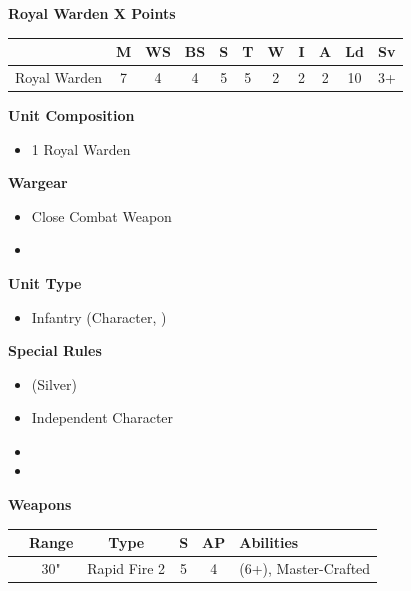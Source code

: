 \subsubsection[Royal Warden]{}
\begin{minipage}[t]{0.72\textwidth}
	{\large \textbf{Royal Warden \dotfill X Points}}
	
	\begin{tabular}{m{165 pt} *{10}{c}}
		& M & WS & BS & S & T & W & I & A & Ld & Sv \\
		\hline
		Royal Warden & 7 & 4 & 4 & 5 & 5 & 2 & 2 & 2 & 10 & 3+ \\
	\end{tabular}
	\small
	\begin{minipage}[t]{0.5\textwidth}
		\begin{flushleft}
		\vspace*{2em}
		\textbf{Unit Composition}
		\begin{itemize}
			\item 1 Royal Warden
		\end{itemize}
		
		\textbf{Wargear}
		\begin{itemize}
			\item Close Combat Weapon
			\item {}
		\end{itemize}
		\end{flushleft}
	\end{minipage}
	\begin{minipage}{0.5\textwidth}
		\vspace*{2em}
		\textbf{Unit Type}
		\begin{itemize}
			\item Infantry (Character, )
		\end{itemize}
		
		\textbf{Special Rules}
		\begin{itemize}
			\item {} (Silver)
			\item Independent Character
			\item {}
			\item %
		\end{itemize}
	\end{minipage}
	
	\vspace*{2em}
	\textbf{Weapons}
	
	\begin{tabular}{m{95 pt} *{4}{c} >{\raggedright\arraybackslash}p{130pt}}
		& Range & Type & S & AP & Abilities \\
		\hline
		\quickref{Relic Gauss Blaster} & 30" & Rapid Fire 2 & 5 & 4 & \quickref{Gauss} (6+), Master-Crafted \\
	\end{tabular}
\end{minipage}
